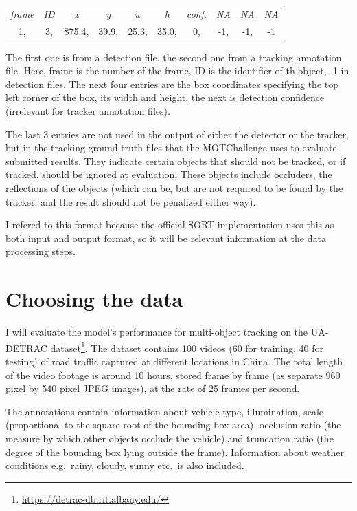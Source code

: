 \begin{table}[h]
    \centering
    \begin{tabular}{c c c c c c c c c c}
        \textit{frame} & \textit{ID} & \textit{x} & \textit{y} & \textit{w} & \textit{h} & \textit{conf.} & \textit{NA} & \textit{NA} & \textit{NA} \\
        1, & 3, & 875.4, & 39.9, & 25.3, & 35.0, & 0, & -1, & -1, & -1 \\
    \end{tabular}
\end{table}

The first one is from a detection file, the second one from a tracking annotation file. Here, frame is the number of the frame, ID is the identifier of th object, -1 in detection files. The next four entries are the box coordinates specifying the top left corner of the box, its width and height, the next is detection confidence (irrelevant for tracker annotation files).

The last 3 entries are not used in the output of either the detector or the tracker, but in the tracking ground truth files that the MOTChallenge uses to evaluate submitted results. They indicate certain objects that should not be tracked, or if tracked, should be ignored at evaluation. These objects include occluders, the reflections of the objects (which can be, but are not required to be found by the tracker, and the result should not be penalized either way).

I refered to this format because the official SORT implementation uses this as both input and output format, so it will be relevant information at the data processing steps.

\section{Choosing the data}

I will evaluate the model's performance for multi-object tracking on the UA-DETRAC dataset\footnote{\url{https://detrac-db.rit.albany.edu/}}. The dataset contains 100 videos (60 for training, 40 for testing) of road traffic captured at different locations in China. The total length of the video footage is around 10 hours, stored frame by frame (as separate 960 pixel by 540 pixel JPEG images), at the rate of 25 frames per second.

The annotations contain information about vehicle type, illumination, scale (proportional to the square root of the bounding box area), occlusion ratio (the measure by which other objects occlude the vehicle) and truncation ratio (the degree of the bounding box lying outside the frame). Information about weather conditions e.g.~rainy, cloudy, sunny etc.~is also included.


